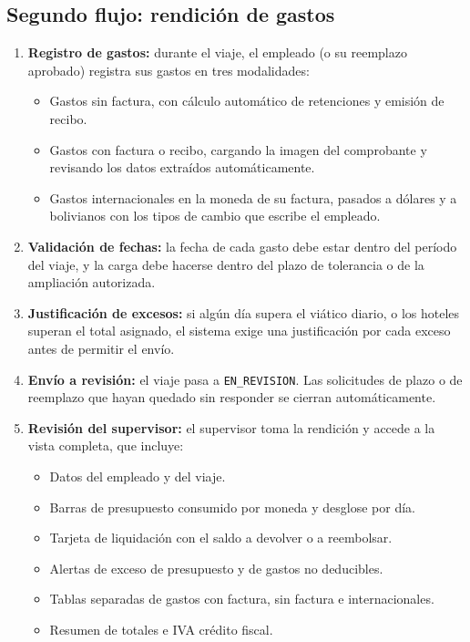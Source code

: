 \documentclass[11pt,letterpaper]{article}
\newcommand{\code}[1]{\nolinkurl{#1}}
\begin{document}
\subsection{Segundo flujo: rendición de gastos}
\begin{enumerate}
  \item \textbf{Registro de gastos:} durante el viaje, el empleado (o su reemplazo aprobado) registra sus gastos en tres modalidades:
  \begin{itemize}
    \item Gastos sin factura, con cálculo automático de retenciones y emisión de recibo.
    \item Gastos con factura o recibo, cargando la imagen del comprobante y revisando los datos extraídos automáticamente.
    \item Gastos internacionales en la moneda de su factura, pasados a dólares y a bolivianos con los tipos de cambio que escribe el empleado.
  \end{itemize}
  \item \textbf{Validación de fechas:} la fecha de cada gasto debe estar dentro del período del viaje, y la carga debe hacerse dentro del plazo de tolerancia o de la ampliación autorizada.
  \item \textbf{Justificación de excesos:} si algún día supera el viático diario, o los hoteles superan el total asignado, el sistema exige una justificación por cada exceso antes de permitir el envío.
  \item \textbf{Envío a revisión:} el viaje pasa a \code{EN_REVISION}. Las solicitudes de plazo o de reemplazo que hayan quedado sin responder se cierran automáticamente.
  \item \textbf{Revisión del supervisor:} el supervisor toma la rendición y accede a la vista completa, que incluye:
  \begin{itemize}
    \item Datos del empleado y del viaje.
    \item Barras de presupuesto consumido por moneda y desglose por día.
    \item Tarjeta de liquidación con el saldo a devolver o a reembolsar.
    \item Alertas de exceso de presupuesto y de gastos no deducibles.
    \item Tablas separadas de gastos con factura, sin factura e internacionales.
    \item Resumen de totales e IVA crédito fiscal.
  \end{itemize}

\end{enumerate}
\end{document}
